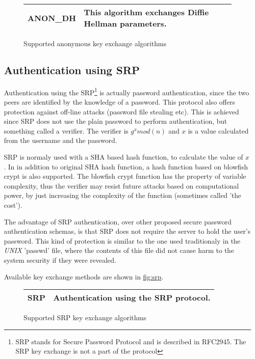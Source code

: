 \begin{figure}[hbtp]
\begin{tabular}{|l|p{9cm}|}

\hline
ANON\_DH & This algorithm exchanges Diffie Hellman parameters. 
\\
\hline
\end{tabular}

\caption{Supported anonymous key exchange algorithms}
\label{fig:anon}

\end{figure}

\subsection{Authentication using SRP}
Authentication using the SRP\footnote{SRP stands for Secure Password Protocol and 
is described in RFC2945. The SRP key exchange is not a part of the \tlsI protocol}
is actually password authentication, since the two peers are identified by the knowledge of a password. 
This protocol also offers protection against off-line attacks (password file stealing etc). 
This is achieved since SRP does not use the plain password to perform authentication, but something called a 
verifier. The verifier is $g^{x}mod(n)$ and $x$ is a value calculated
from the username and the password. 
\par SRP is normaly used with a SHA based hash function, to calculate
the value of $x$. In \gnutls in addition to original SHA hash function,
a hash function based on blowfish crypt is also supported. The blowfish
crypt function has the property of variable complexity, thus the
verifier may resist future attacks based on computational power, by just increasing
the complexity of the function (sometimes called 'the cost').
\par The advantage of SRP authentication, over other proposed secure password 
authentication schemas, is that SRP does not require the server to hold
the user's password. This kind of protection is similar to the one used traditionaly
in the \emph{UNIX} 'passwd' file, where the contents of this file did not cause
harm to the system security if they were revealed.
\par
Available key exchange methods are shown in \hyperref{figure}{figure }{}{fig:srp}.

\begin{figure}[hbtp]
\begin{tabular}{|l|p{9cm}|}

\hline
SRP & Authentication using the SRP protocol. 
\\
\hline
\end{tabular}

\caption{Supported SRP key exchange algorithms}
\label{fig:srp}

\end{figure}

